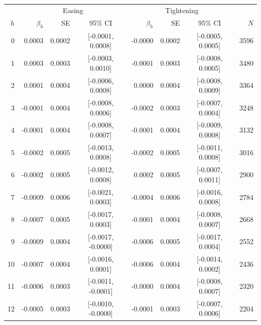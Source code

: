 \begin{tabular}{r r r c r r c r}
\toprule
 & \multicolumn{3}{c}{Easing} & \multicolumn{3}{c}{Tightening} & \\
$h$ & $\beta_h$ & SE & 95\% CI & $\beta_h$ & SE & 95\% CI & $N$ \\
\midrule
0 & 0.0003 & 0.0002 & [-0.0001, 0.0008] & -0.0000 & 0.0002 & [-0.0005, 0.0005] & 3596 \\
1 & 0.0003 & 0.0003 & [-0.0003, 0.0010] & -0.0001 & 0.0003 & [-0.0008, 0.0005] & 3480 \\
2 & 0.0001 & 0.0004 & [-0.0006, 0.0008] & 0.0000 & 0.0004 & [-0.0008, 0.0009] & 3364 \\
3 & -0.0001 & 0.0004 & [-0.0008, 0.0006] & -0.0002 & 0.0003 & [-0.0007, 0.0004] & 3248 \\
4 & -0.0001 & 0.0004 & [-0.0008, 0.0007] & -0.0001 & 0.0004 & [-0.0009, 0.0008] & 3132 \\
5 & -0.0002 & 0.0005 & [-0.0013, 0.0008] & -0.0002 & 0.0005 & [-0.0011, 0.0008] & 3016 \\
6 & -0.0002 & 0.0005 & [-0.0012, 0.0008] & 0.0002 & 0.0005 & [-0.0007, 0.0011] & 2900 \\
7 & -0.0009 & 0.0006 & [-0.0021, 0.0003] & -0.0004 & 0.0006 & [-0.0016, 0.0008] & 2784 \\
8 & -0.0007 & 0.0005 & [-0.0017, 0.0003] & -0.0001 & 0.0004 & [-0.0008, 0.0007] & 2668 \\
9 & -0.0009 & 0.0004 & [-0.0017, -0.0000] & -0.0006 & 0.0005 & [-0.0017, 0.0004] & 2552 \\
10 & -0.0007 & 0.0004 & [-0.0016, 0.0001] & -0.0006 & 0.0004 & [-0.0014, 0.0002] & 2436 \\
11 & -0.0006 & 0.0003 & [-0.0011, -0.0001] & -0.0000 & 0.0004 & [-0.0008, 0.0007] & 2320 \\
12 & -0.0005 & 0.0003 & [-0.0010, -0.0000] & -0.0001 & 0.0003 & [-0.0007, 0.0006] & 2204 \\
\bottomrule
\end{tabular}
